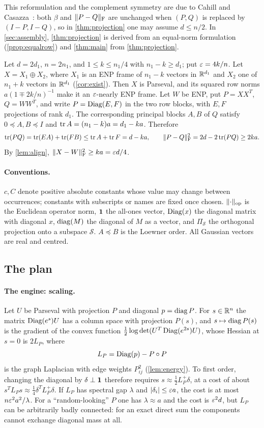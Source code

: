 This reformulation and the complement symmetry are due to Cahill and
Casazza~\cite{CC}: both $\beta$ and $\lVert P-Q\rVert_{\mathrm F}$ are unchanged when $(P,Q)$ is
replaced by $(I-P,I-Q)$, so in \cref{thm:projection} one may assume $d\le n/2$.
In \cref{sec:assembly}, \cref{thm:projection} is derived from an equal-norm
formulation (\cref{prop:equalrow}) and \cref{thm:main} from
\cref{thm:projection}.

\begin{remark}[Optimality]\label{rem:optimal}
Let $d=2d_1$, $n=2n_1$, and $1\le k\le n_1/4$ with $n_1-k\ge d_1$; put
$\varepsilon=4k/n$. Let $X=X_1\oplus X_2$, where $X_1$ is an ENP frame of $n_1-k$
vectors in $\mathbb R^{d_1}$ and $X_2$ one of $n_1+k$ vectors in $\mathbb R^{d_1}$
(\cref{cor:exist}). Then $X$ is Parseval, and its squared row norms
$a(1\mp2k/n)^{-1}$ make it an $\varepsilon$-nearly ENP frame. Let $W$ be ENP, put
$P=XX^T$, $Q=WW^T$, and write $P=\operatorname{Diag}(E,F)$ in the two row blocks, with
$E,F$ projections of rank $d_1$. The corresponding principal blocks $A,B$ of
$Q$ satisfy $0\preceq A,B\preceq I$ and $\operatorname{tr} A=(n_1-k)a=d_1-ka$. Therefore
\[
 \operatorname{tr}(PQ)=\operatorname{tr}(EA)+\operatorname{tr}(FB)\le\operatorname{tr} A+\operatorname{tr} F=d-ka,
 \qquad \lVert P-Q\rVert_{\mathrm F}^2=2d-2\operatorname{tr}(PQ)\ge2ka.
\]
By \cref{lem:align}, $\lVert X-W\rVert_{\mathrm F}^2\ge ka=\varepsilon d/4$.
\end{remark}

\paragraph{Conventions.} $c,C$ denote positive absolute constants whose value
may change between occurrences; constants with subscripts or names are fixed
once chosen. $\lVert \cdot\rVert_{\mathrm{op}}$ is the Euclidean operator norm, $\mathbf 1$ the all-ones
vector, $\operatorname{Diag}(x)$ the diagonal matrix with diagonal $x$, $\operatorname{diag}(M)$ the diagonal
of $M$ as a vector, and $\Pi_{\mathcal S}$ the orthogonal projection onto a
subspace $\mathcal S$. $A\preceq B$ is the Loewner order. All Gaussian vectors are
real and centred.

\subsection{The plan}\label{subsec:plan}

\paragraph{The engine: scaling.}
Let $U$ be Parseval with projection $P$ and diagonal $p=\operatorname{diag} P$. For
$s\in\mathbb R^n$ the matrix $\operatorname{Diag}(e^s)U$ has a column space with projection $P(s)$,
and $s\mapsto\operatorname{diag} P(s)$ is the gradient of the convex function
$\frac12\log\det(U^T\operatorname{Diag}(e^{2s})U)$, whose Hessian at $s=0$ is $2L_P$, where
\[
 L_P=\operatorname{Diag}(p)-P\circ P
\]
is the graph Laplacian with edge weights $P_{ij}^2$ (\cref{lem:energy}). To
first order, changing the diagonal by $\delta\perp\mathbf 1$ therefore requires
$s\approx\frac12L_P^{+}\delta$, at a cost of about
$s^TL_Ps\approx\frac14\delta^TL_P^{+}\delta$. If $L_P$ has spectral gap
$\lambda$ and $|\delta_i|\le\varepsilon a$, the cost is at most $n\varepsilon^2a^2/\lambda$.
For a ``random-looking'' $P$ one has $\lambda\approx a$ and the cost is
$\varepsilon^2 d$, but $L_P$ can be arbitrarily badly connected: for an exact direct
sum the components cannot exchange diagonal mass at all.

